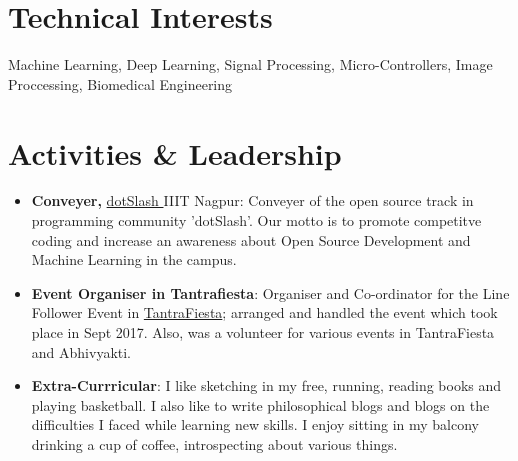 \documentclass[a4paper,10pt]{extarticle} %
\begin{document}

\vspace{-0.3cm}
\section{\textcolor{primary}{Technical Interests}}

\noindent Machine Learning, Deep Learning, Signal Processing, Micro-Controllers, Image Proccessing, Biomedical Engineering \\


\vspace{-0.3cm}
\section{\textcolor{primary}{Activities \& Leadership}}

\begin{itemize}[leftmargin=0.55cm, rightmargin=0.2cm, label={\Large\textbullet}]
\item \textbf{Conveyer, }\href{https://iiit-nagpur.github.io/website-PC/}{ dotSlash  }IIIT Nagpur: Conveyer of the open source track in programming community 'dotSlash'. Our motto is to promote competitve coding and increase an awareness about Open Source Development and Machine Learning in the campus.
\item \textbf{Event Organiser in Tantrafiesta}: Organiser and Co-ordinator for the Line Follower Event in \href{https://tantrafiesta.in}{TantraFiesta}; arranged and handled the event which took place in Sept 2017. Also, was a volunteer for various events in TantraFiesta and Abhivyakti.
\item \textbf{Extra-Currricular}: I like sketching in my free, running, reading books and playing basketball. I also like to write philosophical blogs and blogs on the difficulties I faced while learning new skills. I enjoy sitting in my balcony drinking a cup of coffee, introspecting about various things.
\\
\end{itemize}








\end{document}
